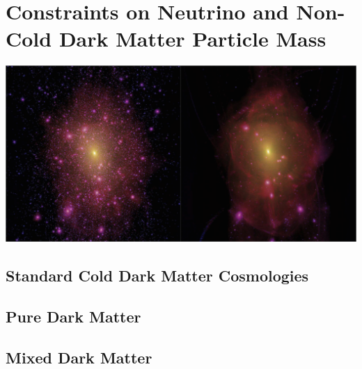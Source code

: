 \documentclass[11pt, twoside, a4paper, openright]{report}
\begin{document}
\chapter{Constraints on Neutrino and Non-Cold Dark Matter Particle Mass}
{\color{purple}\titlerule[2.5pt]}
\vspace{4pc}%
\label{chap:results}
{\centering
\includegraphics[width=\textwidth]{Visu/wdmcdm.png}}
\clearpage

	

	\section{Standard Cold Dark Matter Cosmologies}
	\label{sec:lcdm}
	

	\section{Pure Dark Matter}
	\label{sec:pdm}
	

	\section{Mixed Dark Matter}
	\label{sec:mdm}
	

\setcounter{chapter}{6}


\appendix








\end{document}
